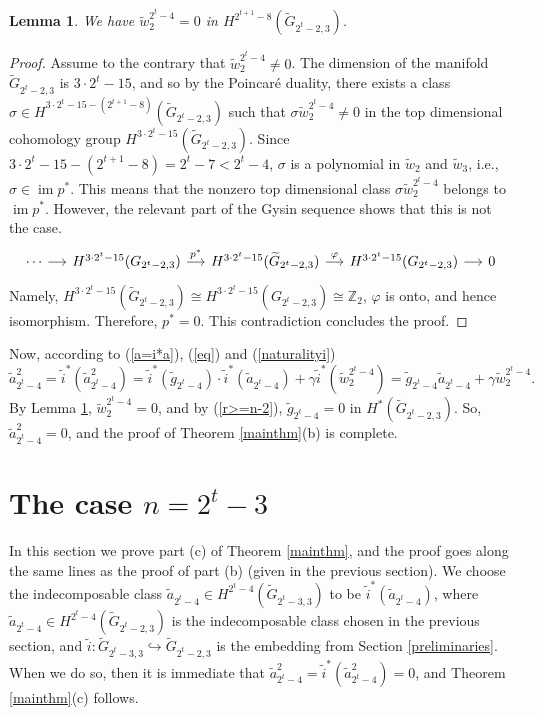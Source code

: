 \documentclass{amsart}
\newcommand{\im}{\operatorname{im}}
\newtheorem{lemma}[theorem]{Lemma}
\theoremstyle{definition}
\theoremstyle{remark}
\numberwithin{equation}{section}
\begin{document}
 \begin{lemma}\label{w_2}
  We have $\widetilde w_2^{2^t-4}=0$ in $H^{2^{t+1}-8}(\widetilde G_{2^t-2,3})$.
 \end{lemma}
\begin{proof}
    Assume to the contrary that $\widetilde w_2^{2^t-4}\neq0$. The dimension of the manifold $\widetilde G_{2^t-2,3}$ is $3\cdot2^t-15$, and so by the Poincar\'e duality, there exists a class $\sigma\in H^{3\cdot2^t-15-(2^{t+1}-8)}(\widetilde G_{2^t-2,3})$ such that $\sigma\widetilde w_2^{2^t-4}\neq0$ in the top dimensional cohomology group $H^{3\cdot2^t-15}(\widetilde G_{2^t-2,3})$. Since $3\cdot2^t-15-(2^{t+1}-8)=2^t-7<2^t-4$, $\sigma$ is a polynomial in $\widetilde w_2$ and $\widetilde w_3$, i.e., $\sigma\in\im p^*$. This means that the nonzero top dimensional class $\sigma\widetilde w_2^{2^t-4}$ belongs to $\im p^*$. However, the relevant part of the Gysin sequence shows that this is not the case.
    \[
\begin{tikzcd}[column sep = 1.3em]
    \cdots
    \arrow{r}
    &
    H^{3\cdot 2^t - 15}(G_{2^t-2,3})
    \arrow{r}{p^*}
    &
    H^{3\cdot 2^t - 15}(\widetilde G_{2^t-2,3})
    \arrow{r}{\varphi}
    &
    H^{3\cdot 2^t - 15}(G_{2^t-2,3})
    \arrow{r}
    &
    0
\end{tikzcd}
\]
Namely, $H^{3\cdot 2^t - 15}(\widetilde G_{2^t-2,3})\cong H^{3\cdot 2^t - 15}(G_{2^t-2,3})\cong\mathbb Z_2$, $\varphi$ is onto, and hence isomorphism. Therefore, $p^*=0$. This contradiction concludes the proof.
\end{proof}

Now, according to (\ref{a=i*a}), (\ref{eq}) and (\ref{naturalityi})
\[\widetilde a_{2^t-4}^2=\widetilde i^*(\widetilde a_{2^t-4}^2)=\widetilde i^*(\widetilde g_{2^t-4})\cdot\widetilde i^*(\widetilde a_{2^t-4})+\gamma\widetilde i^*(\widetilde w_2^{2^t-4})=\widetilde g_{2^t-4}\widetilde a_{2^t-4}+\gamma\widetilde w_2^{2^t-4}.\]
By Lemma \ref{w_2}, $\widetilde w_2^{2^t-4}=0$, and by (\ref{r>=n-2}), $\widetilde g_{2^t-4}=0$ in $H^*(\widetilde G_{2^t-2,3})$. So, $\widetilde a_{2^t-4}^2=0$, and the proof of Theorem \ref{mainthm}(b) is complete.



\section{The case $n=2^t-3$}
\label{2t-3}

In this section we prove part (c) of Theorem \ref{mainthm}, and the proof goes along the same lines as the proof of part (b) (given in the previous section). We choose the indecomposable class $\widetilde a_{2^t-4}\in H^{2^t-4}(\widetilde G_{2^t-3,3})$ to be $\widetilde i^*(\widetilde a_{2^t-4})$, where $\widetilde a_{2^t-4}\in H^{2^t-4}(\widetilde G_{2^t-2,3})$ is the indecomposable class chosen in the previous section, and $\widetilde i:\widetilde G_{2^t-3,3}\hookrightarrow\widetilde G_{2^t-2,3}$ is the embedding from Section \ref{preliminaries}. When we do so, then it is immediate that $\widetilde a_{2^t-4}^2=\widetilde i^*(\widetilde a_{2^t-4}^2)=0$, and Theorem \ref{mainthm}(c) follows.
\end{document}
